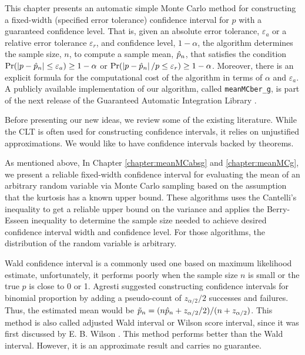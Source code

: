 \documentclass{iitthesis}
\theoremstyle{definition}
\begin{document}
This chapter presents an automatic simple Monte Carlo method for constructing a fixed-width (specified error tolerance) confidence interval for $p$ with a guaranteed confidence level. That is, given an absolute error tolerance, $\varepsilon_a$ or a relative error tolerance $\varepsilon_r$, and confidence level, $1-\alpha$, the algorithm determines the sample size, $n$, to compute a sample mean, $\hat{p}_n$, that satisfies the condition $\Pr(\left \lvert p-\hat{p}_n \right \rvert\leq \varepsilon_a) \geq 1-\alpha$ or $\Pr(\left \lvert p-\hat{p}_n \right \rvert/p\leq \varepsilon_r) \geq 1-\alpha$.  Moreover, there is an explicit formula for the computational cost of the algorithm in terms of $\alpha$ and $\varepsilon_a$. A publicly available implementation of our algorithm, called {\tt meanMCber\_g}, is part of the next release of the Guaranteed Automatic Integration Library \cite{GAIL_2_1}.


Before presenting our new ideas, we review some of the existing literature.  While the CLT is often used for constructing confidence intervals, it relies on unjustified approximations.  We would like to have confidence intervals backed by theorems.

As mentioned above, In Chapter \ref{chapter:meanMCabsg} and \ref{chapter:meanMCg}, we present a reliable fixed-width confidence interval for evaluating the mean of an arbitrary random variable via Monte Carlo sampling based on the assumption that the kurtosis has a known upper bound. These algorithms uses the Cantelli's inequality to get a reliable upper bound on the variance and applies the Berry-Esseen inequality to determine the sample size needed to achieve desired confidence interval width and confidence level. For those algorithms, the distribution of the random variable is arbitrary. 

Wald confidence interval \cite[Section 1.3.3]{Agresti02} is a commonly used one based on maximum likelihood estimate, unfortunately, it performs poorly when the sample size $n$ is small or the true $p$ is close to 0 or 1. Agresti \cite[Section 1.4.2]{Agresti02} suggested constructing confidence intervals for binomial proportion by adding a pseudo-count of $z_{\alpha/2}/2$ successes and failures. Thus, the estimated mean would be $\tilde{p}_n =(n\hat{p}_n+z_{\alpha/2}/2) / (n+z_{\alpha/2})$. This method is also called adjusted Wald interval or Wilson score interval, since it was first discussed by E. B. Wilson \cite{wilson27}. This method performs better than the Wald interval. However, it is an approximate result and carries no guarantee.
\end{document}
